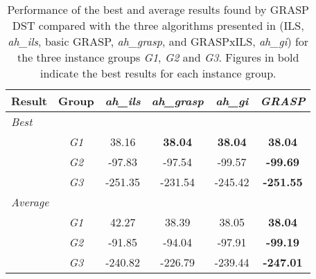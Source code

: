 \begin{table}[htbp!]
\centering
    \caption{Performance of the best and average results found by GRASP DST compared with the three algorithms presented in \citet{aithaddadene2016} (ILS, \emph{ah\_ils}, basic GRASP,  \emph{ah\_grasp}, and GRASPxILS, \emph{ah\_gi}) for the three instance groups \emph{G1}, \emph{G2} and \emph{G3}. Figures in bold indicate the best results for each instance group. }
    \begin{tabular}{cccccc}
    \toprule
Result  &   Group   &   \emph{ah\_ils}  &   \emph{ah\_grasp}    &   \emph{ah\_gi}   &   \emph{GRASP}    \\  \midrule
\multicolumn{6}{l}{\emph{Best}} \\                                              
    &   \emph{G1}   &   38.16   &   \textbf{38.04}  &   \textbf{38.04}  &   \textbf{38.04}  \\  
    &   \emph{G2}   &   -97.83  &   -97.54  &   -99.57  &   \textbf{-99.69} \\  
    &   \emph{G3}   &   -251.35 &   -231.54 &   -245.42 &   \textbf{-251.55}    \\  
\multicolumn{6}{l}{\emph{Average}} \\                                              
    &   \emph{G1}   &   42.27   &   38.39   &   38.05   &   \textbf{38.04}  \\  
    &   \emph{G2}   &   -91.85  &   -94.04  &   -97.91  &   \textbf{-99.19} \\  
    &   \emph{G3}   &   -240.82 &   -226.79 &   -239.44 &   \textbf{-247.01}    \\  
    \bottomrule
    \end{tabular}
\label{table:grouptableaithcombined}
\end{table}